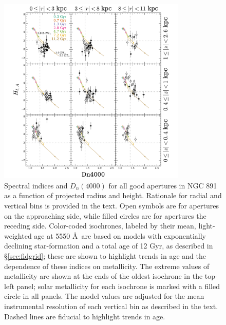\begin{figure}[t]
  \centering
  \includegraphics[width=0.8\textwidth]{891_1/figs/Dn4000_multires.pdf}
  \caption{\label{fig:D4000_cuts}\fixspacing Spectral indices \Hda and
    $D_n(4000)$ for all good apertures in NGC 891 as a function of
    projected radius and height. Rationale for radial and vertical
    bins is provided in the text. Open symbols are for apertures on
    the approaching side, while filled circles are for apertures the
    receding side. Color-coded isochrones, labeled by their mean,
    light-weighted age at 5550 \AA\ are based on models with
    exponentially declining star-formation and a total age of 12 Gyr,
    as described in \S\ref{sec:fidgrid}; these are shown to highlight
    trends in age and the dependence of these indices on
    metallicity. The extreme values of metallicity are shown at the
    ends of the oldest isochrone in the top-left panel; solar
    metallicity for each isochrone is marked with a filled circle in
    all panels. The model values are adjusted for the mean
    instrumental resolution of each vertical bin as described in the
    text. Dashed lines are fiducial to highlight trends in age.}
\end{figure}

